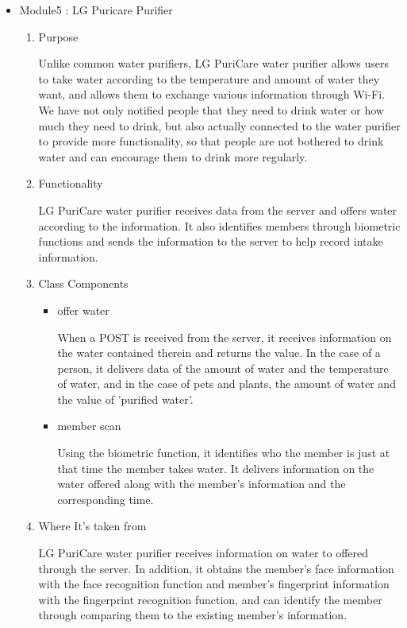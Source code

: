 \documentclass[conference]{IEEEtran}
\begin{document}
\begin{itemize}
    \item Module5 : LG Puricare Purifier
    \begin{enumerate}
    \setlength{\parindent}{2ex}
    \setlength{\parskip}{0.5em}
        \item Purpose
        
        Unlike common water purifiers, LG PuriCare water purifier allows users to take water according to the temperature and amount of water they want, and allows them to exchange various information through Wi-Fi. We have not only notified people that they need to drink water or how much they need to drink, but also actually connected to the water purifier to provide more functionality, so that people are not bothered to drink water and can encourage them to drink more regularly.
        
        
        \item Functionality
        
        LG PuriCare water purifier receives data from the server and offers water according to the information. It also identifies members through biometric functions and sends the information to the server to help record intake information.
        
        
        \item Class Components
        \begin{itemize}
            \item offer water
            \setlength{\parindent}{2ex}
            
            When a POST is received from the server, it receives information on the water contained therein and returns the value. In the case of a person, it delivers data of the amount of water and the temperature of water, and in the case of pets and plants, the amount of water and the value of 'purified water'.
            \item member scan
            \setlength{\parindent}{2ex}
            
            Using the biometric function, it identifies who the member is just at that time the member takes water. It delivers information on the water offered along with the member's information and the corresponding time.
        \end{itemize}
        
        \item Where It's taken from
        
        LG PuriCare water purifier receives information on water to offered through the server. In addition, it obtains the member's face information with the face recognition function and member's fingerprint information with the fingerprint recognition function, and can identify the member through comparing them to the existing member's information.
        

\end{enumerate}
\end{itemize}
\end{document}
